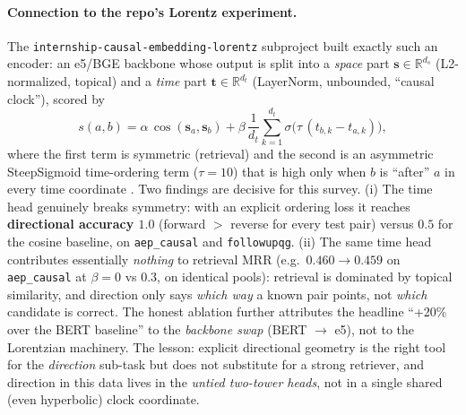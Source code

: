 \paragraph{Connection to the repo's Lorentz experiment.}
The \texttt{internship-causal-embedding-lorentz} subproject built exactly such
an encoder: an e5/BGE backbone whose output is split into a
\emph{space} part $\mathbf{s}\in\mathbb{R}^{d_s}$ (L2-normalized, topical) and a
\emph{time} part $\mathbf{t}\in\mathbb{R}^{d_t}$ (LayerNorm, unbounded,
``causal clock''), scored by
\begin{equation}
s(a,b) = \alpha\,\cos(\mathbf{s}_a,\mathbf{s}_b)
+ \beta\,\frac{1}{d_t}\sum_{k=1}^{d_t}\sigma\!\big(\tau\,(t_{b,k}-t_{a,k})\big),
\end{equation}
where the first term is symmetric (retrieval) and the second is an asymmetric
SteepSigmoid time-ordering term ($\tau{=}10$) that is high only when $b$ is
``after'' $a$ in every time coordinate \citep{geo:repo_lorentz2026}. Two
findings are decisive for this survey. (i) The time head genuinely breaks
symmetry: with an explicit ordering loss it reaches \textbf{directional
accuracy $1.0$} (forward $>$ reverse for every test pair) versus $0.5$ for the
cosine baseline, on \texttt{aep\_causal} and \texttt{followupqg}. (ii) The same
time head contributes essentially \emph{nothing} to retrieval MRR (e.g.\
$0.460\!\to\!0.459$ on \texttt{aep\_causal} at $\beta{=}0$ vs $0.3$, on
identical pools): retrieval is dominated by topical similarity, and direction
only says \emph{which way} a known pair points, not \emph{which} candidate is
correct. The honest ablation further attributes the headline ``+20\% over the
BERT baseline'' to the \emph{backbone swap} (BERT $\to$ e5), not to the
Lorentzian machinery. The lesson: explicit directional geometry is the right
tool for the \emph{direction} sub-task but does not substitute for a strong
retriever, and direction in this data lives in the \emph{untied two-tower
heads}, not in a single shared (even hyperbolic) clock coordinate.

